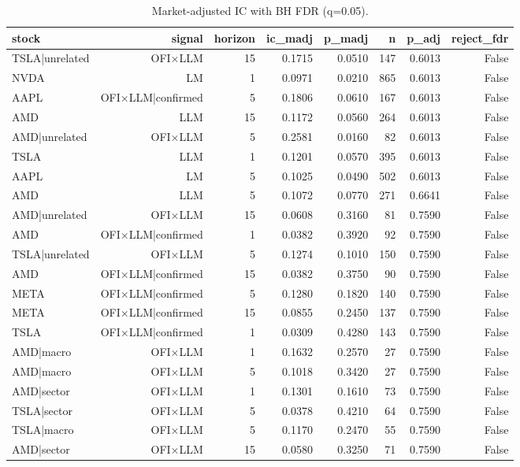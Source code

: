 \begin{table}[htbp]
\centering
\caption{Market-adjusted IC with BH FDR (q=0.05).}
\label{tab:market_adjusted_ic_fdr}
\begin{tabular}{lrrrrrrr}
\toprule
stock & signal & horizon & ic\_madj & p\_madj & n & p\_adj & reject\_fdr \\
\midrule
TSLA|unrelated & OFI×LLM & 15 & 0.1715 & 0.0510 & 147 & 0.6013 & False \\
NVDA & LM & 1 & 0.0971 & 0.0210 & 865 & 0.6013 & False \\
AAPL & OFI×LLM|confirmed & 5 & 0.1806 & 0.0610 & 167 & 0.6013 & False \\
AMD & LLM & 15 & 0.1172 & 0.0560 & 264 & 0.6013 & False \\
AMD|unrelated & OFI×LLM & 5 & 0.2581 & 0.0160 & 82 & 0.6013 & False \\
TSLA & LLM & 1 & 0.1201 & 0.0570 & 395 & 0.6013 & False \\
AAPL & LM & 5 & 0.1025 & 0.0490 & 502 & 0.6013 & False \\
AMD & LLM & 5 & 0.1072 & 0.0770 & 271 & 0.6641 & False \\
AMD|unrelated & OFI×LLM & 15 & 0.0608 & 0.3160 & 81 & 0.7590 & False \\
AMD & OFI×LLM|confirmed & 1 & 0.0382 & 0.3920 & 92 & 0.7590 & False \\
TSLA|unrelated & OFI×LLM & 5 & 0.1274 & 0.1010 & 150 & 0.7590 & False \\
AMD & OFI×LLM|confirmed & 15 & 0.0382 & 0.3750 & 90 & 0.7590 & False \\
META & OFI×LLM|confirmed & 5 & 0.1280 & 0.1820 & 140 & 0.7590 & False \\
META & OFI×LLM|confirmed & 15 & 0.0855 & 0.2450 & 137 & 0.7590 & False \\
TSLA & OFI×LLM|confirmed & 1 & 0.0309 & 0.4280 & 143 & 0.7590 & False \\
AMD|macro & OFI×LLM & 1 & 0.1632 & 0.2570 & 27 & 0.7590 & False \\
AMD|macro & OFI×LLM & 5 & 0.1018 & 0.3420 & 27 & 0.7590 & False \\
AMD|sector & OFI×LLM & 1 & 0.1301 & 0.1610 & 73 & 0.7590 & False \\
TSLA|sector & OFI×LLM & 5 & 0.0378 & 0.4210 & 64 & 0.7590 & False \\
TSLA|macro & OFI×LLM & 5 & 0.1170 & 0.2470 & 55 & 0.7590 & False \\
AMD|sector & OFI×LLM & 15 & 0.0580 & 0.3250 & 71 & 0.7590 & False \\

\end{tabular}
\end{table}
